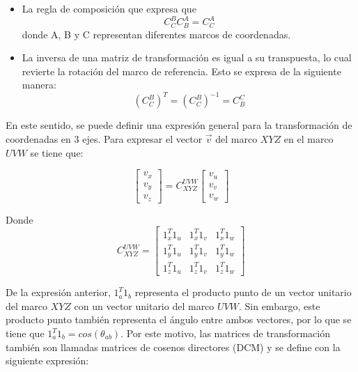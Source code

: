 \begin{itemize}
	
	\item La regla de composición que expresa que 
	\begin{equation}
		C_{C}^{B} C_{B}^{A} = C_{C}^{A}\label{eq:transformada1}
	\end{equation}
	donde A, B y C representan diferentes marcos de coordenadas.
	
	\item La inversa de una matriz de transformación es igual a su transpuesta, lo cual revierte la rotación del marco de referencia. Esto se expresa de la siguiente manera:
		\begin{equation}
			 \left(C_{C}^{B}\right)^T = \left(C_{C}^{B}\right)^{-1} = C_{B}^{C}\label{eq:transformada2}
		\end{equation}
		
\end{itemize}

En este sentido, se puede definir una expresión general para la transformación de coordenadas en 3 ejes. Para expresar el vector $\vec{v}$ del marco $XYZ$ en el marco $UVW$ se tiene que:

$$
\left[\begin{array}{c}
	v_x\\
	v_y\\
	v_z
\end{array}\right] = 
C_{XYZ}^{UVW}
\left[\begin{array}{c}
	v_u\\
	v_v\\
	v_w
\end{array}\right]
$$

Donde
$$
C_{XYZ}^{UVW} = \left[\begin{array}{ccc}
	1_x^{T}1_u & 1_x^{T}1_v & 1_x^{T}1_w\\
	1_y^{T}1_u & 1_y^{T}1_v & 1_y^{T}1_w\\
	1_z^{T}1_u & 1_z^{T}1_v & 1_z^{T}1_w
\end{array}\right]
$$

De la expresión anterior, $1_{a}^{T}1_b$ representa el producto punto de un vector unitario del marco $XYZ$ con un vector unitario del marco $UVW$. Sin embargo, este producto punto también representa el ángulo entre ambos vectores, por lo que se tiene que $1_a^{T}1_b = cos\left(\theta_{ab}\right)$. Por este motivo, las matrices de transformación también son llamadas matrices de cosenos directores (DCM) y se define con la siguiente expresión:

